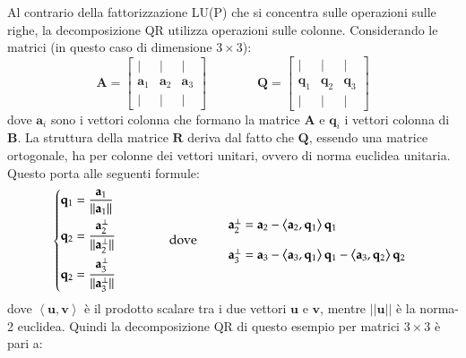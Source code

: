 \documentclass[10pt]{article}
\begin{document}
Al contrario della fattorizzazione LU(P) che si concentra sulle operazioni sulle righe, la decomposizione QR utilizza operazioni sulle colonne.
Considerando le matrici (in questo caso di dimensione $3\times 3$):
\begin{equation}
\mathbf{A} = 
\begin{bmatrix}
| & | & | \\
\mathbf{a}_1 & \mathbf{a}_2 & \mathbf{a}_3 \\
| & | & |
\end{bmatrix}
\qquad \qquad
\mathbf{Q} = 
\begin{bmatrix}
| & | & | \\
\mathbf{q}_1 & \mathbf{q}_2 & \mathbf{q}_3 \\
| & | & |
\end{bmatrix}
\end{equation}
dove $\mathbf{a}_i$ sono i vettori colonna che formano la matrice $\mathbf{A}$ e $\mathbf{q}_i$ i vettori colonna di $\mathbf{B}$.
La struttura della matrice $\mathbf{R}$ deriva dal fatto che $\mathbf{Q}$, essendo una matrice ortogonale, ha per colonne dei vettori unitari, ovvero di norma euclidea unitaria.
Questo porta alle seguenti formule:
\begin{equation}
\begin{dcases}
\mathbf{q}_1 = \frac{\mathbf{a}_1}{||\mathbf{a}_1||} \\
\mathbf{q}_2 = \frac{\mathbf{a}_2^\perp}{||\mathbf{a}_2^\perp||} \\
\mathbf{q}_2 = \frac{\mathbf{a}_3^\perp}{||\mathbf{a}_3^\perp||}
\end{dcases}
\qquad\qquad \text{dove} \qquad
\begin{array}{l}
\mathbf{a}_2^\perp  = \mathbf{a}_2 - \left<\mathbf{a}_2,\mathbf{q}_1\right> \mathbf{q}_1 \\ \\
\mathbf{a}_3^\perp  = \mathbf{a}_3 - \left<\mathbf{a}_3,\mathbf{q}_1\right> \mathbf{q}_1 - \left<\mathbf{a}_3,\mathbf{q}_2\right> \mathbf{q}_2
\end{array}
\end{equation}
dove $\left<\mathbf{u},\mathbf{v}\right>$ è il prodotto scalare tra i due vettori $\mathbf{u}$ e $\mathbf{v}$, mentre $||\mathbf{u}||$ è la norma-2 euclidea.
Quindi la decomposizione QR di questo esempio per matrici $3\times 3$ è pari a:
\end{document}
